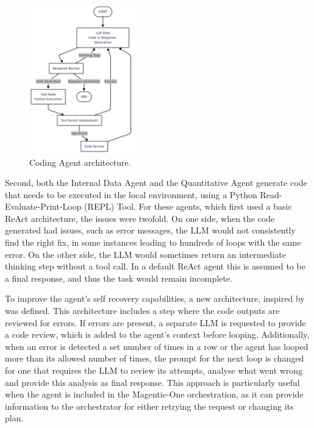 \documentclass[a4paper]{report}
\begin{document}
\begin{figure}[h]
\centering
\includegraphics[width=0.4\textwidth]{images/coding-workflow.png}
\caption{Coding Agent architecture.}
\label{fig:coding-workflow}
\end{figure}

Second, both the Internal Data Agent and the Quantitative Agent generate code that needs to be executed in the local environment, using a Python Read-Evaluate-Print-Loop (REPL) Tool. For these agents, which first used a basic ReAct architecture, the issues were twofold. On one side, when the code generated had issues, such as error messages, the LLM would not consistently find the right fix, in some instances leading to hundreds of loops with the same error. On the other side, the LLM would sometimes return an intermediate thinking step without a tool call. In a default ReAct agent this is assumed to be a final response, and thus the task would remain incomplete.

To improve the agent's self recovery capabilities, a new architecture, inspired by \cite{shinn2023reflexion} was defined. This architecture includes a step where the code outputs are reviewed for errors. If errors are present, a separate LLM is requested to provide a code review, which is added to the agent's context before looping. Additionally, when an error is detected a set number of times in a row or the agent has looped more than its allowed number of times, the prompt for the next loop is changed for one that requires the LLM to review its attempts, analyse what went wrong and provide this analysis as final response. This approach is particularly useful when the agent is included in the Magentic-One orchestration, as it can provide information to the orchestrator for either retrying the request or changing its plan.
\end{document}
